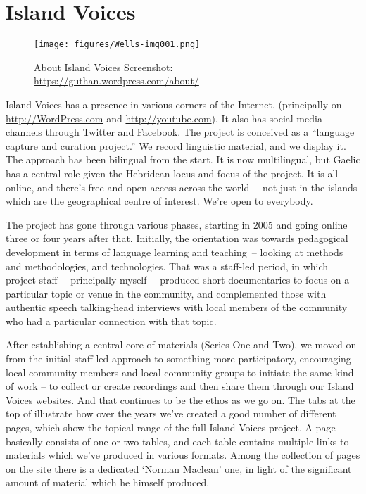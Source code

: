 \documentclass[output=paper,colorlinks,citecolor=brown]{langscibook}
\begin{document}
\section{Island Voices}


\begin{figure}[ht]
    \texttt{[image: figures/Wells-img001.png]}
    \caption{About Island Voices Screenshot: \url{https://guthan.wordpress.com/about/}}
    \label{fig:wells:2}
\end{figure}

Island Voices has a presence in various corners of the Internet, (principally on \url{http://WordPress.com} and \url{http://youtube.com}). It also has social media channels through Twitter and Facebook. The project is conceived as a ``language capture and curation project.” We record linguistic material, and we display it. The approach has been bilingual from the start. It is now multilingual, but Gaelic has a central role given the Hebridean locus and focus of the project. It is all online, and there’s free and open access across the world~-- not just in the islands which are the geographical centre of interest. We’re open to everybody.

The project has gone through various phases, starting in 2005 and going online three or four years after that. Initially, the orientation was towards pedagogical development in terms of language learning and teaching~-- looking at methods and methodologies, and technologies. That was a staff-led period, in which project staff~-- principally myself~-- produced short documentaries to focus on a particular topic or venue in the community, and complemented those with authentic speech \citep{gw:Widdowson1998} 
talking-head interviews with local members of the community who had a particular connection with that topic.

After establishing a central core of materials (Series One and Two), we moved on from the initial staff-led approach to something more participatory, encouraging local community members and local community groups to initiate the same kind of work – to collect or create recordings and then share them through our Island Voices websites. And that continues to be the ethos as we go on. The tabs at the top of  
illustrate how over the years we’ve created a good number of different pages, which show the topical range of the full Island Voices project. A page basically consists of one or two tables, and each table contains multiple links to materials which we’ve produced in various formats. Among the collection of pages on the site there is a dedicated `Norman Maclean' one, in light of the significant amount of material which he himself produced.
\end{document}
